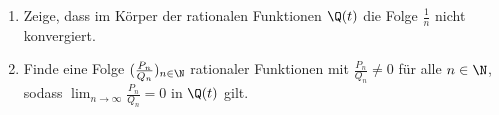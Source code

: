 \begin{prob}
  \begin{enumerate}[label=(\alph*)]
  \item Zeige, dass im Körper der rationalen Funktionen $\Q(t)$ die
    Folge $\frac{1}{n}$ nicht konvergiert.
  \item Finde eine Folge $(\frac{P_n}{Q_n})_{n \in \N}$ rationaler Funktionen mit
    $\frac{P_n}{Q_n} \neq 0$ für alle $n \in \N$, sodass
    $\lim_{n \to \infty} \frac{P_n}{Q_n} = 0 $ in $\Q(t)$ gilt.
  \end{enumerate}
\end{prob}
